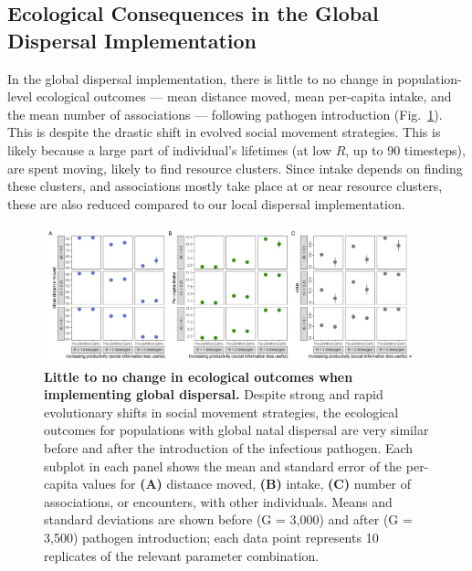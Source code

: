\subsection*{Ecological Consequences in the Global Dispersal Implementation}

In the global dispersal implementation, there is little to no change in population-level ecological outcomes --- mean distance moved, mean per-capita intake, and the mean number of associations --- following pathogen introduction (Fig.~\ref{fig:patho_global_eco}).
This is despite the drastic shift in evolved social movement strategies.
This is likely because a large part of individual's lifetimes (at low $R$, up to 90 timesteps), are spent moving, likely to find resource clusters.
Since intake depends on finding these clusters, and associations mostly take place at or near resource clusters, these are also reduced compared to our local dispersal implementation.

\begin{figure}
    \centering
    \includegraphics[width=0.95\textwidth]{figures/pathomove/fig_eco_compare_global.png}
    \caption{
        \textbf{Little to no change in ecological outcomes when implementing global dispersal.} 
        Despite strong and rapid evolutionary shifts in social movement strategies, the ecological outcomes for populations with global natal dispersal are very similar before and after the introduction of the infectious pathogen. 
        Each subplot in each panel shows the mean and standard error of the per-capita values for \textbf{(A)} distance moved, \textbf{(B)} intake, \textbf{(C)} number of associations, or encounters, with other individuals. 
        Means and standard deviations are shown before (G = 3,000) and after (G = 3,500) pathogen introduction; each data point represents 10 replicates of the relevant parameter combination.
    }\label{fig:patho_global_eco}
\end{figure}

